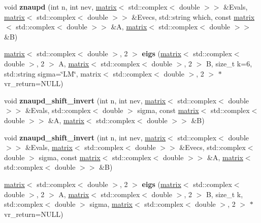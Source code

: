 \begin{DoxyCompactItemize}
\item 
\hypertarget{namespacekeycpp_ad82232bc5f219be9ffc4313d29755465}{void {\bfseries znaupd} (int n, int nev, \hyperlink{classkeycpp_1_1matrix}{matrix}$<$ std\-::complex$<$ double $>$$>$ \&Evals, \hyperlink{classkeycpp_1_1matrix}{matrix}$<$ std\-::complex$<$ double $>$$>$ \&Evecs, std\-::string which, const \hyperlink{classkeycpp_1_1matrix}{matrix}$<$ std\-::complex$<$ double $>$$>$ \&A, \hyperlink{classkeycpp_1_1matrix}{matrix}$<$ std\-::complex$<$ double $>$$>$ \&B)}\label{namespacekeycpp_ad82232bc5f219be9ffc4313d29755465}

\item 
\hypertarget{namespacekeycpp_ab5e47ab53db5cd76c38c2f561903f4a7}{\hyperlink{classkeycpp_1_1matrix}{matrix}$<$ std\-::complex$<$ double $>$, 2 $>$ {\bfseries eigs} (\hyperlink{classkeycpp_1_1matrix}{matrix}$<$ std\-::complex$<$ double $>$, 2 $>$ A, \hyperlink{classkeycpp_1_1matrix}{matrix}$<$ std\-::complex$<$ double $>$, 2 $>$ B, size\-\_\-t k=6, std\-::string sigma=\char`\"{}L\-M\char`\"{}, matrix$<$ std\-::complex$<$ double $>$, 2 $>$ $\ast$vr\-\_\-return=N\-U\-L\-L)}\label{namespacekeycpp_ab5e47ab53db5cd76c38c2f561903f4a7}

\item 
\hypertarget{namespacekeycpp_a451ee1ae5c27500a4a1b7a4b351352d1}{void {\bfseries znaupd\-\_\-shift\-\_\-invert} (int n, int nev, \hyperlink{classkeycpp_1_1matrix}{matrix}$<$ std\-::complex$<$ double $>$$>$ \&Evals, std\-::complex$<$ double $>$ sigma, const \hyperlink{classkeycpp_1_1matrix}{matrix}$<$ std\-::complex$<$ double $>$$>$ \&A, \hyperlink{classkeycpp_1_1matrix}{matrix}$<$ std\-::complex$<$ double $>$$>$ \&B)}\label{namespacekeycpp_a451ee1ae5c27500a4a1b7a4b351352d1}

\item 
\hypertarget{namespacekeycpp_a76e9f0c111ebd439a8457c6d11a5c97f}{void {\bfseries znaupd\-\_\-shift\-\_\-invert} (int n, int nev, \hyperlink{classkeycpp_1_1matrix}{matrix}$<$ std\-::complex$<$ double $>$$>$ \&Evals, \hyperlink{classkeycpp_1_1matrix}{matrix}$<$ std\-::complex$<$ double $>$$>$ \&Evecs, std\-::complex$<$ double $>$ sigma, const \hyperlink{classkeycpp_1_1matrix}{matrix}$<$ std\-::complex$<$ double $>$$>$ \&A, \hyperlink{classkeycpp_1_1matrix}{matrix}$<$ std\-::complex$<$ double $>$$>$ \&B)}\label{namespacekeycpp_a76e9f0c111ebd439a8457c6d11a5c97f}

\item 
\hypertarget{namespacekeycpp_a495cd6f90a746c4a2f39736e865b3096}{\hyperlink{classkeycpp_1_1matrix}{matrix}$<$ std\-::complex$<$ double $>$, 2 $>$ {\bfseries eigs} (\hyperlink{classkeycpp_1_1matrix}{matrix}$<$ std\-::complex$<$ double $>$, 2 $>$ A, \hyperlink{classkeycpp_1_1matrix}{matrix}$<$ std\-::complex$<$ double $>$, 2 $>$ B, size\-\_\-t k, std\-::complex$<$ double $>$ sigma, \hyperlink{classkeycpp_1_1matrix}{matrix}$<$ std\-::complex$<$ double $>$, 2 $>$ $\ast$vr\-\_\-return=N\-U\-L\-L)}\label{namespacekeycpp_a495cd6f90a746c4a2f39736e865b3096}

\end{DoxyCompactItemize}


